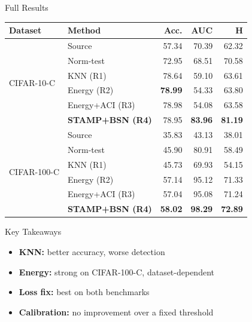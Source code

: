 \documentclass[aspectratio=169,10pt]{beamer}
\begin{document}
\begin{frame}{Full Results}
  \small
  \begin{table}
    \centering
    \renewcommand{\arraystretch}{1.25}
    \begin{tabular}{llrrr}
      \toprule
      \textbf{Dataset} & \textbf{Method} & \textbf{Acc.} & \textbf{AUC} & \textbf{H} \\
      \midrule
      \multirow{6}{*}{CIFAR-10-C}
        & Source            & 57.34 & 70.39 & 62.32 \\
        & Norm-test         & 72.95 & 68.51 & 70.58 \\
        & KNN (R1)          & 78.64 & 59.10 & 63.61 \\
        & Energy (R2)       & \textbf{78.99} & 54.33 & 63.80 \\
        & Energy+ACI (R3)   & 78.98 & 54.08 & 63.58 \\
        & \textbf{STAMP+BSN (R4)} & 78.95 & \textbf{83.96} & \textbf{81.19} \\
      \midrule
      \multirow{6}{*}{CIFAR-100-C}
        & Source            & 35.83 & 43.13 & 38.01 \\
        & Norm-test         & 45.90 & 80.91 & 58.49 \\
        & KNN (R1)          & 45.73 & 69.93 & 54.15 \\
        & Energy (R2)       & 57.14 & 95.12 & 71.33 \\
        & Energy+ACI (R3)   & 57.04 & 95.08 & 71.24 \\
        & \textbf{STAMP+BSN (R4)} & \textbf{58.02} & \textbf{98.29} & \textbf{72.89} \\
      \bottomrule
    \end{tabular}
  \end{table}
\end{frame}

\begin{frame}{Key Takeaways}
  \begin{itemize}
    \setlength\itemsep{5.5mm}
    \item[\iconcircle{crosshairs}{Steel}] \textbf{\color{Navy}KNN:} better accuracy, worse detection
    \item[\iconcircle{bolt}{Orange}] \textbf{\color{Navy}Energy:} strong on CIFAR-100-C, dataset-dependent
    \item[\iconcircle{bug}{Orange}] \textbf{\color{Navy}Loss fix:} best on both benchmarks
    \item[\iconcircle{sliders-h}{Steel}] \textbf{\color{Navy}Calibration:} no improvement over a fixed threshold
  \end{itemize}
\end{frame}
\end{document}
